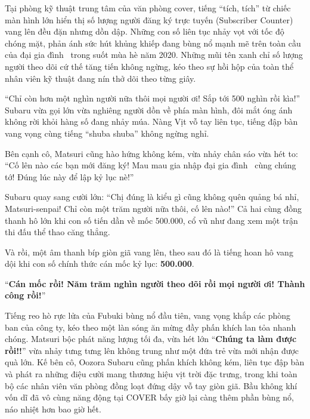\documentclass[../main.tex]{subfiles}
\begin{document}

Tại phòng kỹ thuật trung tâm của văn phòng cover, tiếng ``tích, tích'' từ chiếc màn hình lớn hiển thị số lượng người đăng ký trực tuyến (Subscriber Counter) vang lên đều đặn nhưng dồn dập. Những con số liên tục nhảy vọt với tốc độ chóng mặt, phản ánh sức hút khủng khiếp đang bùng nổ mạnh mẽ trên toàn cầu của đại gia đình \hll\ trong suốt mùa hè năm 2020. Những mũi tên xanh chỉ số lượng người theo dõi cứ thế tăng tiến không ngừng, kéo theo sự hồi hộp của toàn thể nhân viên kỹ thuật đang nín thở dõi theo từng giây.

``Chỉ còn hơn một nghìn người nữa thôi mọi người ơi! Sắp tới 500 nghìn rồi kìa!'' Subaru vừa gọi lớn vừa nghiêng người dồn về phía màn hình, đôi mắt óng ánh không rời khỏi hàng số đang nhảy múa. Nàng Vịt vỗ tay liên tục, tiếng đập bàn vang vọng cùng tiếng ``shuba shuba'' không ngừng nghỉ.

Bên cạnh cô, Matsuri cũng hào hứng không kém, vừa nhảy chân sáo vừa hét to: ``Cố lên nào các bạn mới đăng ký! Mau mau gia nhập đại gia đình \hll\ cùng chúng tớ! Đúng lúc này để lập kỷ lục nè!''

Subaru quay sang cười lớn: ``Chị đúng là kiểu gì cũng không quên quảng bá nhỉ, Matsuri-senpai! Chỉ còn một trăm người nữa thôi, cố lên nào!'' Cả hai cùng đồng thanh hô lớn khi con số tiến dần về mốc 500.000, cổ vũ như đang xem một trận thi đấu thể thao căng thẳng.

Và rồi, một âm thanh bíp giòn giã vang lên, theo sau đó là tiếng hoan hô vang dội khi con số chính thức cán mốc kỷ lục: \textbf{500.000}.

``\textbf{Cán mốc rồi! Năm trăm nghìn người theo dõi rồi mọi người ơi! Thành công rồi!}''

Tiếng reo hò rực lửa của Fubuki bùng nổ đầu tiên, vang vọng khắp các phòng ban của công ty, kéo theo một làn sóng ăn mừng đầy phấn khích lan tỏa nhanh chóng. Matsuri bộc phát năng lượng tối đa, vừa hét lớn ``\textbf{Chúng ta làm được rồi!!}'' vừa nhảy tưng tưng lên không trung như một đứa trẻ vừa mới nhận được quà lớn. Kế bên cô, Oozora Subaru cũng phấn khích không kém, liên tục đập bàn và phát ra những điệu cười mang thương hiệu vịt trời đặc trưng, trong khi toàn bộ các nhân viên văn phòng đồng loạt đứng dậy vỗ tay giòn giã. Bầu không khí vốn dĩ đã vô cùng năng động tại COVER bấy giờ lại càng thêm phần bùng nổ, náo nhiệt hơn bao giờ hết.
\end{document}
